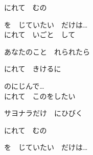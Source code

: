 {にれて　むの

を　じていたい　だけは…
\\

にれて　いごと　して

あなたのこと　れられたら

にれて　きけるに

のにじんで…
\\

にれて　このをしたい

サヨナラだけ　にひびく

にれて　むの

を　じていたい　だけは…

}